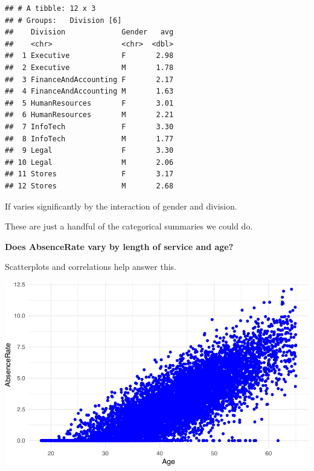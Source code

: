 \documentclass[12pt, krantz2,]{krantz}
\makeatletter
\newenvironment{Shaded}{\begin{snugshade}}{\end{snugshade}}
\newcommand{\CommentTok}[1]{\textcolor[rgb]{0.37,0.37,0.37}{\textit{#1}}}
\newcommand{\DataTypeTok}[1]{\textcolor[rgb]{0.27,0.27,0.27}{#1}}
\newcommand{\KeywordTok}[1]{\textcolor[rgb]{0.27,0.27,0.27}{\textbf{#1}}}
\newcommand{\NormalTok}[1]{#1}
\newcommand{\OperatorTok}[1]{\textcolor[rgb]{0.43,0.43,0.43}{\textbf{#1}}}
\newcommand{\StringTok}[1]{\textcolor[rgb]{0.5,0.5,0.5}{#1}}
\newenvironment{kframe}{%
\medskip{}
\setlength{\fboxsep}{.8em}
 \def\at@end@of@kframe{}%
 \ifinner\ifhmode%
  \def\at@end@of@kframe{\end{minipage}}%
  \begin{minipage}{\columnwidth}%
 \fi\fi%
 \def\FrameCommand##1{\hskip\@totalleftmargin \hskip-\fboxsep
 \colorbox{shadecolor}{##1}\hskip-\fboxsep
     \hskip-\linewidth \hskip-\@totalleftmargin \hskip\columnwidth}%
 \MakeFramed {\advance\hsize-\width
   \@totalleftmargin\z@ \linewidth\hsize
   \@setminipage}}%
 {\par\unskip\endMakeFramed%
 \at@end@of@kframe}
\renewenvironment{Shaded}{\begin{kframe}}{\end{kframe}}
\makeatother
\begin{document}
\begin{Shaded}
\end{Shaded}

\begin{verbatim}
## # A tibble: 12 x 3
## # Groups:   Division [6]
##    Division             Gender   avg
##    <chr>                <chr>  <dbl>
##  1 Executive            F       2.98
##  2 Executive            M       1.78
##  3 FinanceAndAccounting F       2.17
##  4 FinanceAndAccounting M       1.63
##  5 HumanResources       F       3.01
##  6 HumanResources       M       2.21
##  7 InfoTech             F       3.30
##  8 InfoTech             M       1.77
##  9 Legal                F       3.30
## 10 Legal                M       2.06
## 11 Stores               F       3.17
## 12 Stores               M       2.68
\end{verbatim}

If varies significantly by the interaction of gender and division.

These are just a handful of the categorical summaries we could do.

\textbf{Does AbsenceRate vary by length of service and age?}

Scatterplots and correlations help answer this.

\begin{Shaded}
\end{Shaded}

\includegraphics[width=\textwidth]{hendrikfeddersen_files/figure-latex/unnamed-chunk-12-1}
\end{document}
